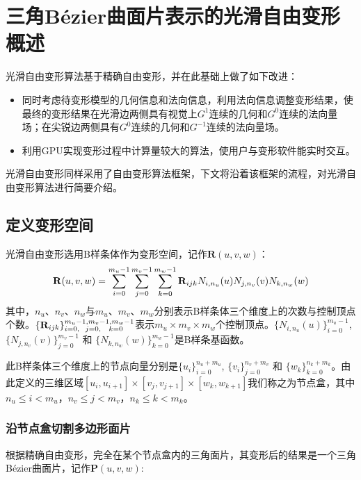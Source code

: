 
\chapter{三角Bézier曲面片表示的光滑自由变形概述}
光滑自由变形算法基于精确自由变形\cite{Feng98}，并在此基础上做了如下改进：

\begin{itemize}
    \item 同时考虑待变形模型的几何信息和法向信息，利用法向信息调整变形结果，使最终的变形结果在光滑边两侧具有视觉上$G^1$连续的几何和$G^0$连续的法向量场；在尖锐边两侧具有$G^0$连续的几何和$G^{-1}$连续的法向量场。
        \item 利用GPU实现变形过程中计算量较大的算法，使用户与变形软件能实时交互。
\end{itemize}

光滑自由变形同样采用了自由变形算法框架，下文将沿着该框架的流程，对光滑自由变形算法进行简要介绍。

\section{定义变形空间}
光滑自由变形选用B样条体作为变形空间，记作$\mathbf R(u,v,w)$：
\begin{equation}
	\footnotesize
	{\mathbf R}(u,v,w) 
	= \sum_{i=0}^{m_u-1}\sum_{j=0}^{m_v-1}\sum_{k=0}^{m_w-1} {\mathbf R}_{ijk}N_{i,n_u}(u)N_{j,n_v}(v)N_{k,n_w}(w)
	\label{equ:Ruvw}
\end{equation}
其中，$n_u$、$n_v$、$n_w$与$m_u$、$m_v$、$m_w$分别表示B样条体三个维度上的次数与控制顶点个数。$\{\mathbf R_{ijk}\}_{i=0,\hspace{6 pt} j=0,\hspace{8 pt} k=0}^{m_u-1,m_v-1,m_w-1}$表示$m_u\times m_v\times m_w$个控制顶点。$\{N_{i,n_u}(u)\}_{i=0}^{m_u-1}$, $\{N_{j,n_v}(v)\}_{j=0}^{m_v-1}$ 和 $\{N_{k,n_w}(w)\}_{k=0}^{m_w-1}$是B样条基函数。

此B样条体三个维度上的节点向量分别是$\{u_i\}^{n_u+m_u}_{i=0}$, $\{v_i\}^{n_v+m_v}_{j=0}$ 和 $\{w_k\}^{n_k+m_k}_{k=0}$。由此定义的三维区域$[u_i, u_{i+1}] \times [v_j, v_{j+1}] \times [w_k, w_{k+1}]$我们称之为节点盒，其中$n_u\leq i < m_u$，$n_v\leq j < m_v$，$n_k\leq k < m_k$。


\subsection{沿节点盒切割多边形面片} \label{sec:clip_against_knot_box}
根据精确自由变形\cite{Feng98, Feng00}，完全在某个节点盒内的三角面片，其变形后的结果是一个三角Bézier曲面片，记作${\mathbf P}(u,v,w)$:\label{section:split}

